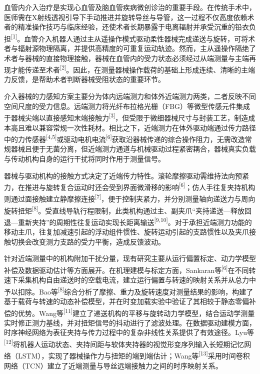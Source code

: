 


血管内介入治疗是实现心血管及脑血管疾病微创诊治的重要手段。在传统手术中，医师需在X射线透视引导下手动推进并旋转导丝与导管，这一过程不仅高度依赖术者的精准操作技巧与临床经验，还使术者长期暴露于电离辐射并承受沉重的铅衣负担\textsuperscript{[1]}。血管介入机器人通过主从遥操作模式驱动柔性器械完成递送与旋转，可将术者与辐射源物理隔离，并提供高精度的可重复运动轨迹。然而，主从遥操作隔绝了术者与器械的直接物理接触，器械在血管内的受力状态必须经过从端测量与主端再现才能传递至术者\textsuperscript{[2]}。因此，在测量器械操作载荷的基础上形成连续、清晰的主端力反馈，是帮助术者判断器械受阻状态的重要环节。

介入器械的力感知方案主要分为体内远端测力和体外近端测力两类，二者反映不同空间尺度的受力信息。远端测力将光纤布拉格光栅（FBG）等微型传感元件集成于器械尖端以直接感知末端接触力\textsuperscript{[3]}，但受限于微细器械尺寸与封装工艺，制造成本高且难以兼容常规一次性耗材。相比之下，近端测力在体外驱动端通过传力路径中的力传感器\textsuperscript{[4,5]}或驱动电机电流\textsuperscript{[6]}获取沿器械传递的综合操作阻力，无需改造常规器械且便于无菌分离，但近端测力通道与机械驱动过程紧密耦合，器械真实负载与传动机构自身的运行干扰将同时作用于测量信号。

器械与驱动机构的接触方式决定了近端传力特性。滚轮摩擦驱动需维持法向预紧力，在推进与旋转复合运动时还会受到界面微滑移的影响\textsuperscript{[6]}；仿人手往复夹持机构则通过面接触建立静摩擦连接\textsuperscript{[7]}，便于控制夹紧力，并分别测量轴向递送力与周向旋转扭矩\textsuperscript{[8]}。受直线导轨行程限制，此类机构通过主、副夹爪“夹持递送---释放回退---重新夹持”的周期性往复运动实现长距离输送\textsuperscript{[9,10]}。对于承担近端测力功能的移动主爪，往复加减速引起的浮动组件惯性、旋转运动引起的支路惯性以及夹爪接触切换会改变测力支路的受力平衡，造成反馈波动。

针对近端测量中的机构附加干扰分量，现有研究主要从运行偏置标定、动力学模型补偿及数据驱动估计等方面展开。在机理建模与标定方面，Sankaran等\textsuperscript{[6]}在不同转速下采集机构自由递送时的空载电流，建立运行偏置与转速的映射关系并从总力中予以扣除。Bao等\textsuperscript{[8]}综合分析了摩擦、重力及旋转速度对测量结果的影响，构建了基于载荷与转速的动态补偿模型，并在时变加载实验中验证了其相较于静态零偏补偿的优势。Wang等\textsuperscript{[11]}建立了递送机构的平移与旋转动力学模型，结合运动学测量实时修正测力基线，并对扭矩信号的抖动进行了滤波处理。在数据驱动建模方面，时序神经网络为表征夹持与传力过程中的复杂非线性关系提供了有效途径。Lyu等\textsuperscript{[12]}将机器人运动状态、夹持间距与软体夹持器的视觉形变序列输入长短期记忆网络（LSTM），实现了器械操作力与扭矩的端到端估计；Wang等\textsuperscript{[13]}采用时间卷积网络（TCN）建立了近端测量与导丝远端接触力之间的时序映射关系。

